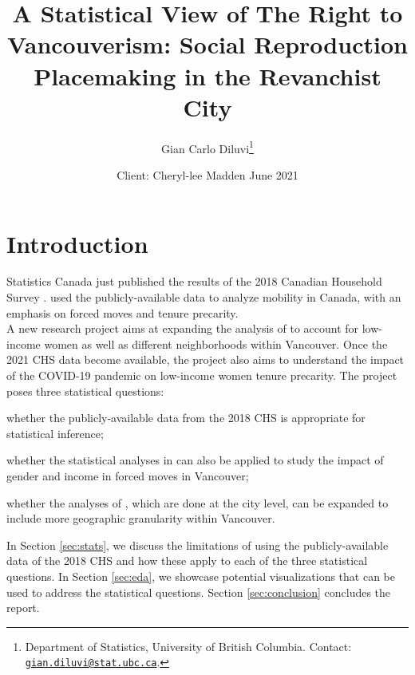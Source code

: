 \documentclass[11pt]{article}
\title{\vspace{-2cm}\Large A Statistical View of The Right to Vancouverism: Social Reproduction Placemaking in the Revanchist City}
\author{\normalsize Gian Carlo Diluvi\footnote{Department of Statistics, University of British Columbia. Contact: \href{mailto:gian.diluvi@stat.ubc.ca}{\texttt{gian.diluvi@stat.ubc.ca}}.}}
\date{\normalsize Client: Cheryl-lee Madden
\vskip 0.1cm
June 2021}
\begin{document}
\maketitle





\section{Introduction}

Statistics Canada just published the results of the 2018 Canadian
Household Survey \cite{chs2018}. \cite{blog} used the publicly-available
data to analyze mobility in Canada, with an emphasis on forced moves
and tenure precarity.
\\

A new research project aims at expanding the analysis of \cite{blog}
to account for low-income women as well as different neighborhoods within
Vancouver. Once the 2021 CHS data become available, the project also aims
to understand the impact of the COVID-19 pandemic on low-income women
tenure precarity.
The project poses three statistical questions:
\benum
  \item whether the publicly-available data from the 2018 CHS is appropriate
  for statistical inference;
  \item whether the statistical analyses in \cite{blog} can also be applied
  to study the impact of gender and income in forced moves in Vancouver;
  \item whether the analyses of \cite{blog}, which are done at the city
  level, can be expanded to include more geographic granularity within Vancouver.
\eenum

In Section \ref{sec:stats}, we discuss the limitations of using the
publicly-available data of the 2018 CHS and how these apply to each
of the three statistical questions. In Section \ref{sec:eda}, we showcase
potential visualizations that can be used to address the statistical
questions. Section \ref{sec:conclusion} concludes the report.
\end{document}
